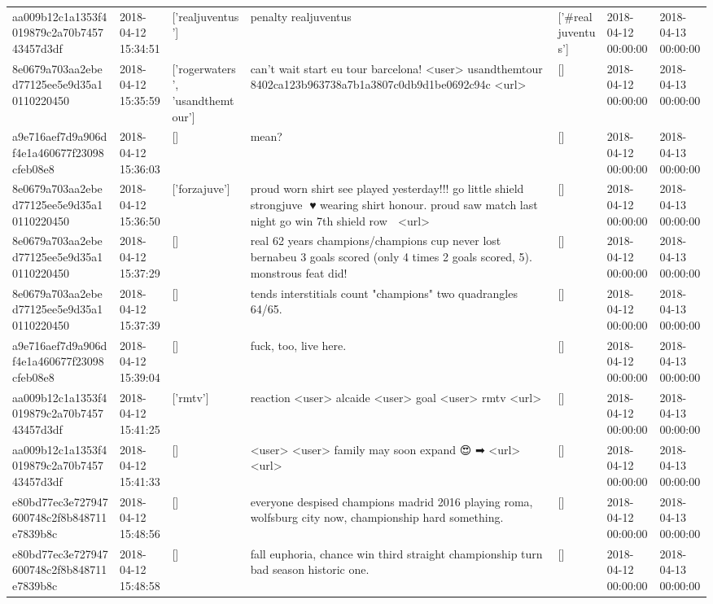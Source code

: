 \begin{tabular}{lllllll}
aa009b12c1a1353f4019879c2a70b745743457d3df & 2018-04-12 15:34:51 & ['realjuventus'] & penalty realjuventus & ['#realjuventus'] & 2018-04-12 00:00:00 & 2018-04-13 00:00:00 \\
8e0679a703aa2ebed77125ee5e9d35a10110220450 & 2018-04-12 15:35:59 & ['rogerwaters', 'usandthemtour'] & can't wait start eu tour barcelona! <user> usandthemtour 8402ca123b963738a7b1a3807c0db9d1be0692c94c <url> & [] & 2018-04-12 00:00:00 & 2018-04-13 00:00:00 \\
a9e716aef7d9a906df4e1a460677f23098cfeb08e8 & 2018-04-12 15:36:03 & [] & mean? & [] & 2018-04-12 00:00:00 & 2018-04-13 00:00:00 \\
8e0679a703aa2ebed77125ee5e9d35a10110220450 & 2018-04-12 15:36:50 & ['forzajuve'] & proud worn shirt see played yesterday!!! go little shield strongjuve 💪♥ wearing shirt honour. proud saw match last night go win 7th shield row 💪 <url> & [] & 2018-04-12 00:00:00 & 2018-04-13 00:00:00 \\
8e0679a703aa2ebed77125ee5e9d35a10110220450 & 2018-04-12 15:37:29 & [] & real 62 years champions/champions cup never lost bernabeu 3 goals scored (only 4 times 2 goals scored, 5). monstrous feat did! & [] & 2018-04-12 00:00:00 & 2018-04-13 00:00:00 \\
8e0679a703aa2ebed77125ee5e9d35a10110220450 & 2018-04-12 15:37:39 & [] & tends interstitials count "champions" two quadrangles 64/65. & [] & 2018-04-12 00:00:00 & 2018-04-13 00:00:00 \\
a9e716aef7d9a906df4e1a460677f23098cfeb08e8 & 2018-04-12 15:39:04 & [] & fuck, too, live here. & [] & 2018-04-12 00:00:00 & 2018-04-13 00:00:00 \\
aa009b12c1a1353f4019879c2a70b745743457d3df & 2018-04-12 15:41:25 & ['rmtv'] & reaction <user> alcaide <user> goal <user> rmtv <url> & [] & 2018-04-12 00:00:00 & 2018-04-13 00:00:00 \\
aa009b12c1a1353f4019879c2a70b745743457d3df & 2018-04-12 15:41:33 & [] & <user> <user> family may soon expand 😍 ➡ <url> <url> & [] & 2018-04-12 00:00:00 & 2018-04-13 00:00:00 \\
e80bd77ec3e727947600748c2f8b848711e7839b8c & 2018-04-12 15:48:56 & [] & everyone despised champions madrid 2016 playing roma, wolfsburg city now, championship hard something. & [] & 2018-04-12 00:00:00 & 2018-04-13 00:00:00 \\
e80bd77ec3e727947600748c2f8b848711e7839b8c & 2018-04-12 15:48:58 & [] & fall euphoria, chance win third straight championship turn bad season historic one. & [] & 2018-04-12 00:00:00 & 2018-04-13 00:00:00 \\

\end{tabular}
